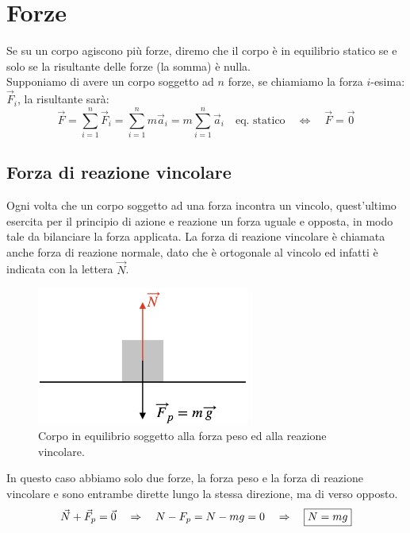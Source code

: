 \section{Forze}
Se su un corpo agiscono più forze, diremo che il corpo è in equilibrio
statico se e solo se la risultante delle forze (la somma) è nulla.\\
Supponiamo di avere un corpo soggetto ad $n$ forze, se chiamiamo la
forza $i$-esima: $\vec F_i$, la risultante sarà:
\begin{equation}
    \vec F = \sum_{i=1}^n\vec F_i =  \sum_{i=1}^n m\vec a_i =
    m \sum_{i=1}^n \vec a_i\quad\mbox{eq. statico}\quad\Leftrightarrow
    \quad\vec F = \vec 0
\label{eq:forces:superposition}
\end{equation}
\subsection{Forza di reazione vincolare}
Ogni volta che un corpo soggetto ad una forza incontra un vincolo,
quest'ultimo esercita per il principio di azione e reazione un forza
uguale e opposta, in modo tale da bilanciare la forza applicata.
La forza di reazione vincolare è chiamata anche forza di reazione normale,
dato che è ortogonale al vincolo ed infatti è indicata con la lettera $\vec N$.
\begin{figure}[htbp]
    \begin{center}
        \includegraphics[width=7cm]{images/NP.png}
        \caption{Corpo in equilibrio soggetto alla forza peso ed  alla
        reazione vincolare.}
    \end{center}
\label{fig:forces:vincolar_reaction}
\end{figure}
In questo caso abbiamo solo due forze, la forza peso e la forza di reazione
vincolare e sono entrambe dirette lungo la stessa direzione, ma di verso
opposto.
\begin{equation}
    \vec N + \vec F_p = \vec 0 \quad\Rightarrow\quad N - F_p = N - mg = 0 \quad\Rightarrow\quad \boxed{N = mg}
\label{eq:forces:vincolar_reaction}
\end{equation}
